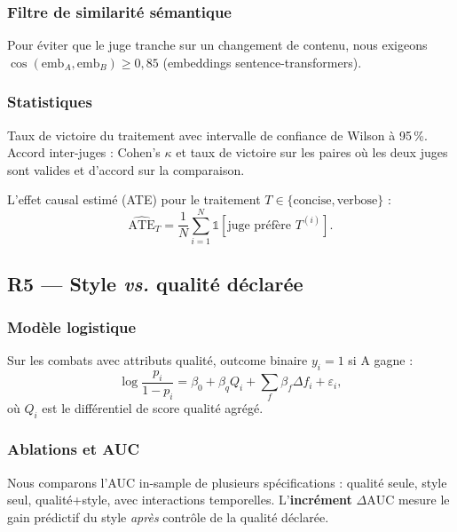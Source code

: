 \documentclass[11pt,a4paper]{article}
\begin{document}
\subsubsection{Filtre de similarité sémantique}

Pour éviter que le juge tranche sur un changement de contenu, nous exigeons
$\cos(\text{emb}_A, \text{emb}_B) \geq 0{,}85$ (embeddings sentence-transformers).

\subsubsection{Statistiques}

Taux de victoire du traitement avec intervalle de confiance de Wilson
\citep{wilson1927probable} à 95\,\%. Accord inter-juges : Cohen's $\kappa$
\citep{cohen1960coefficient} et taux de victoire sur les paires où les deux juges
sont valides et d'accord sur la comparaison.

L'effet causal estimé (ATE) pour le traitement $T \in \{\text{concise}, \text{verbose}\}$ :
\begin{equation}
  \widehat{\text{ATE}}_T = \frac{1}{N}\sum_{i=1}^{N} \mathbb{1}[\text{juge préfère } T^{(i)}].
\end{equation}

\subsection{R5 --- Style \emph{vs.} qualité déclarée}

\subsubsection{Modèle logistique}

Sur les combats avec attributs qualité, outcome binaire $y_i = 1$ si A gagne :
\begin{equation}
  \log\frac{p_i}{1-p_i} = \beta_0 + \beta_q Q_i + \sum_f \beta_f \Delta f_{i} + \varepsilon_i,
  \label{eq:logit}
\end{equation}
où $Q_i$ est le différentiel de score qualité agrégé.

\subsubsection{Ablations et AUC}

Nous comparons l'AUC in-sample de plusieurs spécifications :
qualité seule, style seul, qualité+style, avec interactions temporelles.
L'\textbf{incrément} $\Delta\text{AUC}$ mesure le gain prédictif du style \emph{après}
contrôle de la qualité déclarée.
\end{document}
